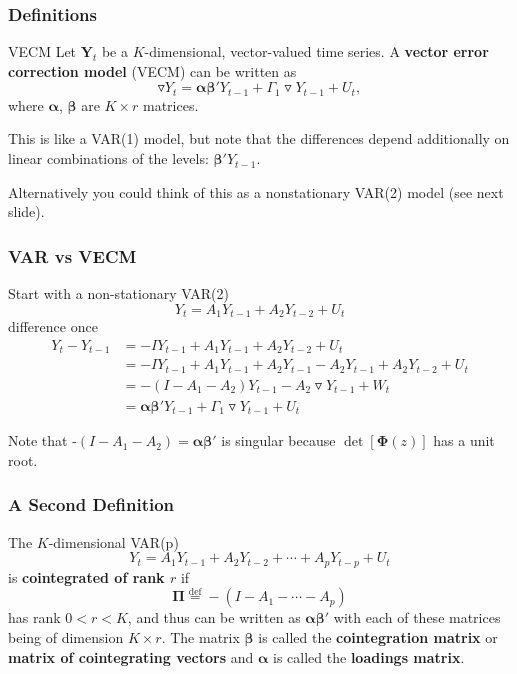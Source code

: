 \documentclass{beamer}
\begin{document}

\begin{frame}
\frametitle{Definitions}

\begin{block}{VECM}
Let $\mathbf{Y}_t$ be a $K$-dimensional, vector-valued time series. A {\bf vector error correction model} (VECM) can be written as
$$
\triangledown Y_t = \bm{\alpha} \bm{\beta} ' Y_{t-1} + \Gamma_1 \triangledown Y_{t-1} + U_t,
$$
where $\bm{\alpha}$, $\bm{\beta}$ are $K \times r$ matrices.
\end{block}

This is like a VAR(1) model, but note that the differences depend additionally on linear combinations of the levels: $ \bm{\beta} ' Y_{t-1}$. 
\newline

Alternatively you could think of this as a nonstationary VAR(2) model (see next slide).

\end{frame}


\begin{frame}
\frametitle{VAR vs VECM}

Start with a non-stationary VAR(2)
$$
Y_t = A_1 Y_{t-1} + A_2 Y_{t-2} + U_t
$$
difference once
\begin{align*}
Y_t - Y_{t-1} &= -IY_{t-1} + A_1 Y_{t-1} + A_2 Y_{t-2} + U_t \\
 &= -IY_{t-1} + A_1 Y_{t-1} + A_2 Y_{t-1} - A_2 Y_{t-1} + A_2 Y_{t-2} + U_t\\
 &= -(I - A_1 - A_2)Y_{t-1} - A_2 \triangledown Y_{t-1} + W_t \\
 &= \bm{\alpha} \bm{\beta} ' Y_{t-1} + \Gamma_1 \triangledown Y_{t-1} + U_t
\end{align*}

Note that -$(I - A_1 - A_2) = \bm{\alpha} \bm{\beta} '$ is singular because $\det[ \bm{\Phi}(z)]$ has a unit root. 

\end{frame}



\begin{frame}
\frametitle{A Second Definition}

The $K$-dimensional VAR(p)
$$
Y_t = A_1 Y_{t-1} + A_2 Y_{t-2} + \cdots + A_pY_{t-p} + U_t
$$
is {\bf cointegrated of rank $r$} if 
$$
\bm{\Pi} \overset{\text{def}}{=} -(I - A_1 - \cdots - A_p)
$$
has rank $0 < r < K$, and thus can be written as $\bm{\alpha} \bm{\beta}'$ with each of these matrices being of dimension $K \times r$. The matrix $\bm{\beta}$ is called the {\bf cointegration matrix} or {\bf matrix of cointegrating vectors} and $\bm{\alpha}$ is called the {\bf loadings matrix}. 

\end{frame}
\end{document}
